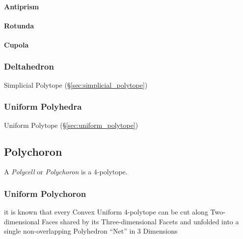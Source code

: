 \paragraph{Antiprism}\label{sec:antiprism}\hfill

\paragraph{Rotunda}\label{sec:rotunda}\hfill

\paragraph{Cupola}\label{sec:cupola}\hfill



\subsubsection{Deltahedron}\label{sec:deltahedron}

Simplicial Polytope (\S\ref{sec:simplicial_polytope})



\subsubsection{Uniform Polyhedra}\label{sec:uniform_polyhedra}

\fist Uniform Polytope (\S\ref{sec:uniform_polytope})



\subsection{Polychoron}\label{sec:polychoron}

A \emph{Polycell} or \emph{Polychoron} is a $4$-polytope.



\subsubsection{Uniform Polychoron}\label{sec:uniform_polychoron}

it is known that every Convex Uniform $4$-polytope can be cut along
Two-dimensional Faces shared by its Three-dimensional Facets and unfolded into
a single non-overlapping Polyhedron ``Net'' in $3$ Dimensions



